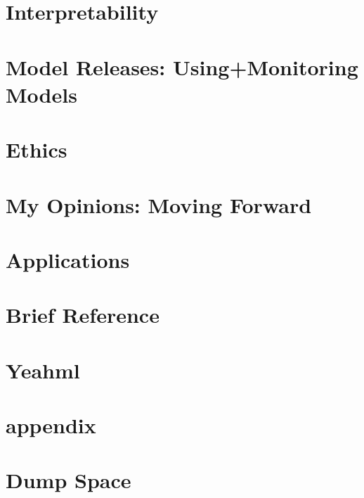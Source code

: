 \documentclass[12pt]{book}
\begin{document}


\part{Interpretability}




\part{Model Releases: Using+Monitoring Models}



\part{Ethics}



\part{My Opinions: Moving Forward}




\part{Applications}





\part{Brief Reference}





\part{Yeahml}




\part{appendix}




\part{Dump Space}
\end{document}
